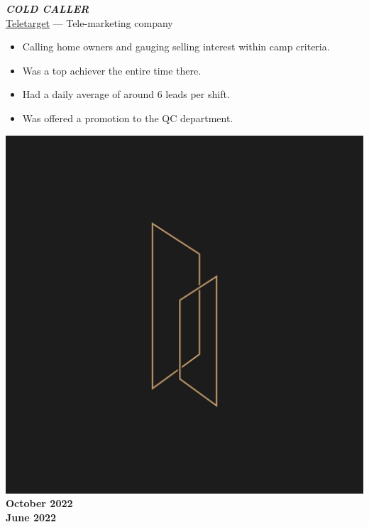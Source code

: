 \documentclass[10pt]{article}
\newcommand{\fancy}[1]{\Large\textbf{\textit{#1}}}
\begin{document}
\vspace{3em}

\noindent
\begin{minipage}{0.7\textwidth}
 \fancy{COLD CALLER} \\
	{\large \href{https://www.linkedin.com/company/tele-target}{Teletarget} --- Tele-marketing company} \\
\begin{itemize}
    \item Calling home owners and gauging selling interest within camp criteria.
    \item Was a top achiever the entire time there.
    \item Had a daily average of around 6 leads per shift.
    \item Was offered a promotion to the QC department.
\end{itemize}   
\end{minipage}
\hspace{35pt}
\begin{minipage}{0.2\textwidth}
\begin{center}
\includegraphics[width=\textwidth]{tt_coldcalling.jpg} \\
    \large\textbf{October 2022\\June 2022}
\end{center}
\end{minipage}
\end{document}
